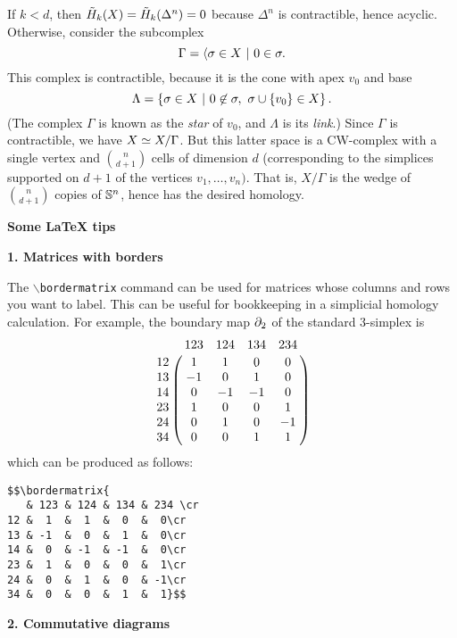 
\soln If $k<d$, then $\tilde H_k(X)=\tilde H_k(\Delta^n)=0$ because $\Delta^n$ is contractible, hence acyclic.
Otherwise, consider the subcomplex
\[\Gamma=\langle\sigma\in X~|~ 0\in\sigma.\]
This complex is contractible, because it is the cone with apex $v_0$ and base
\[\Lambda=\left\{\sigma\in X~|~ 0\not\in\sigma,\ \sigma\cup\{v_0\}\in X\right\}.\]
(The complex $\Gamma$ is known as the \emph{star} of $v_0$, and $\Lambda$ is its \emph{link}.)
Since $\Gamma$ is contractible, we have $X\simeq X/\Gamma$.  But this latter space is a CW-complex with a single vertex and $\binom{n}{d+1}$ cells of dimension $d$ (corresponding to the simplices supported on $d+1$ of the vertices $v_1,\dots,v_n)$.  That is, $X/\Gamma$ is the wedge of $\binom{n}{d+1}$ copies of $\mathbb{S}^n$, hence has the desired homology.



\vfill
\pagebreak

\textbf{\Large Some LaTeX tips}

\textbf{1. Matrices with borders}

The $\backslash$\texttt{bordermatrix} command
can be used for matrices whose columns and rows
you want to label.  This can be useful for bookkeeping
in a simplicial homology calculation.
For example, the boundary map $\partial_2$ of the standard 3-simplex
is
$$
\bordermatrix{
   & 123 & 124 & 134 & 234 \cr
12 &  1  &  1  &  0  &  0\cr
13 & -1  &  0  &  1  &  0\cr
14 &  0  & -1  & -1  &  0\cr
23 &  1  &  0  &  0  &  1\cr
24 &  0  &  1  &  0  & -1\cr
34 &  0  &  0  &  1  &  1
}
$$
which can be produced as follows:
\begin{verbatim}
$$\bordermatrix{
   & 123 & 124 & 134 & 234 \cr
12 &  1  &  1  &  0  &  0\cr
13 & -1  &  0  &  1  &  0\cr
14 &  0  & -1  & -1  &  0\cr
23 &  1  &  0  &  0  &  1\cr
24 &  0  &  1  &  0  & -1\cr
34 &  0  &  0  &  1  &  1}$$
\end{verbatim}

\textbf{2. Commutative diagrams}

